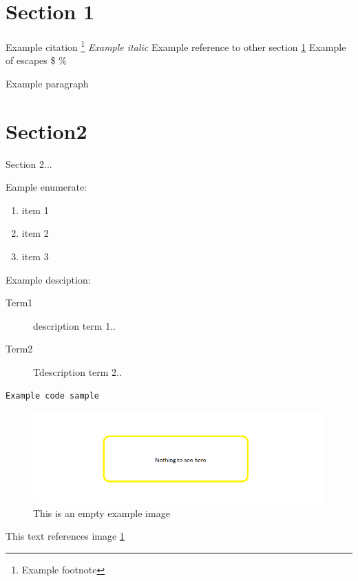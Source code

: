 \section{Section 1}\label{section1}
Example citation\cite{exampleArticle}
\footnote{Example footnote}
\textit{Example italic}
Example reference to other section \ref{section1}
Example of escapes \$ \% \- 

Example paragraph

\section{Section2} \label{section2}
Section 2...


Eample enumerate: \begin{enumerate}
\item item 1
\item item 2
\item item 3
\end{enumerate}

Example desciption:

\begin{description}
\item [Term1] \label{term1}description term 1..
\item [Term2] \label{term2}Tdescription term 2..
\end{description}

\lstset{style=sharpc}
\begin{lstlisting}
Example code sample
\end{lstlisting}

\begin{figure}[ht!]
  \centering
  \includegraphics[width=\textwidth]{Images/empty.png}
  \caption{This is an empty example image}
  \label{ExampleImage1}
\end{figure}

This text references image \ref{ExampleImage1}